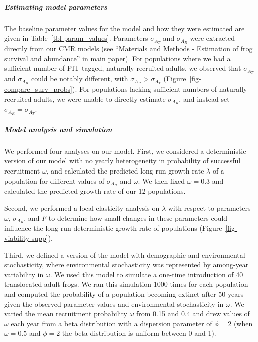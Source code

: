 \documentclass[9pt,twoside,lineno]{pnas-new}
\begin{document}
\hypertarget{estimating-model-parameters}{%
\subparagraph{Estimating model
parameters}\label{estimating-model-parameters}}

The baseline parameter values for the model and how they were estimated
are given in Table~\ref{tbl-param_values}. Parameters \(\sigma_{A_T}\)
and \(\sigma_{A_R}\) were extracted directly from our CMR models (see
``Materials and Methods - Estimation of frog survival and abundance'' in
main paper). For populations where we had a sufficient number of
PIT-tagged, naturally-recruited adults, we observed that
\(\sigma_{A_T}\) and \(\sigma_{A_R}\) could be notably different, with
\(\sigma_{A_R} > \sigma_{A_T}\) (Figure~\ref{fig-compare_surv_probs}).
For populations lacking sufficient numbers of naturally-recruited
adults, we were unable to directly estimate \(\sigma_{A_R}\), and
instead set \(\sigma_{A_R} = \sigma_{A_T}\).

\hypertarget{model-analysis-and-simulation}{%
\subparagraph{Model analysis and
simulation}\label{model-analysis-and-simulation}}

We performed four analyses on our model. First, we considered a
deterministic version of our model with no yearly heterogeneity in
probability of successful recruitment \(\omega\), and calculated the
predicted long-run growth rate \(\lambda\) of a population for different
values of \(\sigma_{A_R}\) and \(\omega\). We then fixed
\(\omega = 0.3\) and calculated the predicted growth rate of our 12
populations.

Second, we performed a local elasticity analysis on \(\lambda\) with
respect to parameters \(\omega\), \(\sigma_{A_R}\), and \(F\) to
determine how small changes in these parameters could influence the
long-run deterministic growth rate of populations
(Figure~\ref{fig-viability-supp}).

Third, we defined a version of the model with demographic and
environmental stochasticity, where environmental stochasticity was
represented by among-year variability in \(\omega\). We used this model
to simulate a one-time introduction of 40 translocated adult frogs. We
ran this simulation 1000 times for each population and computed the
probability of a population becoming extinct after 50 years given the
observed parameter values and environmental stochasticity in \(\omega\).
We varied the mean recruitment probability \(\omega\) from 0.15 and 0.4
and drew values of \(\omega\) each year from a beta distribution with a
dispersion parameter of \(\phi = 2\) (when \(\omega = 0.5\) and
\(\phi = 2\) the beta distribution is uniform between 0 and 1).
\end{document}
